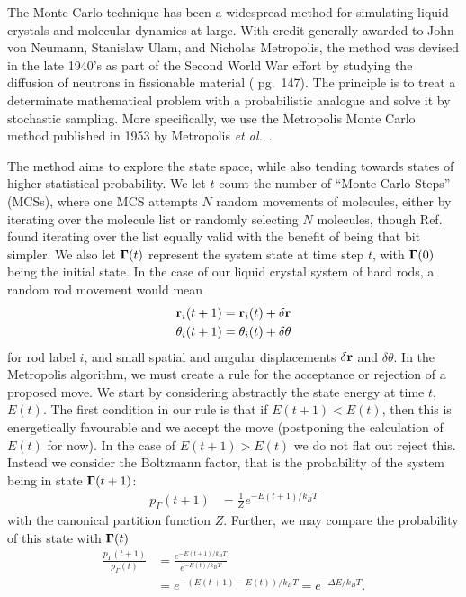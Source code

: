 The Monte Carlo technique has been a widespread method for simulating liquid crystals and molecular dynamics at large. With credit generally awarded to John von Neumann, Stanislaw Ulam, and Nicholas Metropolis, the method was devised in the late 1940's as part of the Second World War effort by studying the diffusion of neutrons in fissionable material (\cite{allenbook} pg.\ 147). The principle is to treat a determinate mathematical problem with a probabilistic analogue and solve it by stochastic sampling. More specifically, we use the Metropolis Monte Carlo method published in 1953 by Metropolis \textit{et al.}\ \cite{metropolis1953}.

The method aims to explore the state space, while also tending towards states of higher statistical probability. We let $t$ count the number of ``Monte Carlo Steps'' (MCSs), where one MCS attempts $N$ random movements of molecules, either by iterating over the molecule list or randomly selecting $N$ molecules, though Ref.\ \cite{hastings1970} found iterating over the list equally valid with the benefit of being that bit simpler. We also let $\mathbf{\Gamma}(t)$ represent the system state at time step $t$, with $\mathbf{\Gamma}(0)$ being the initial state. In the case of our liquid crystal system of hard rods, a random rod movement would mean
\begin{align}
	\mathbf{r}_i(t+1) &= \mathbf{r}_i(t) + \delta\mathbf{r}\\
	\theta_i(t+1) &= \theta_i(t) + \delta\theta
	\label{eq:mcmoves}
\end{align}
for rod label $i$, and small spatial and angular displacements $\delta\mathbf{r}$ and $\delta\theta$. 
In the Metropolis algorithm, we must create a rule for the acceptance or rejection of a proposed move. We start by considering abstractly the state energy at time $t$, $E(t)$. The first condition in our rule is that if $E(t+1) < E(t)$, then this is energetically favourable and we accept the move (postponing the calculation of $E(t)$ for now). In the case of $E(t+1) > E(t)$ we do not flat out reject this. Instead we consider the Boltzmann factor, that is the probability of the system being in state $\mathbf{\Gamma}(t+1)$:
\begin{align}
	p_\Gamma(t+1) &= \frac{1}{Z}e^{-E(t+1)/k_BT}
\end{align}
with the canonical partition function $Z$. 
Further, we may compare the probability of this state with $\mathbf{\Gamma}(t)$ 
\begin{align}
	\nonumber
	\frac{p_\Gamma(t+1)}{p_\Gamma(t)} &= 
	\frac{e^{-E(t+1)/k_BT}}{e^{-E(t)/k_BT}}\\
	&=e^{-(E(t+1) - E(t))/k_BT} = e^{-\Delta E/k_BT}.
	\label{eq:pGamma}
\end{align}

